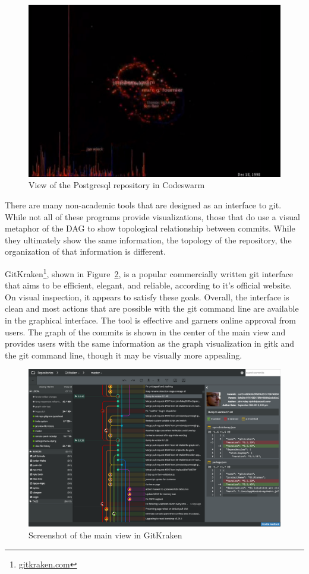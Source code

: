 \begin{figure}[htpb]
  \centering
  \includegraphics[width=0.8\linewidth]{Figures/introduction/codeswarm.png}
  \caption{View of the Postgresql repository in Codeswarm\cite{ogawa09}}
  \label{fig:codeswarm}
\end{figure}

There are many non-academic tools that are designed as an interface to
git.
While not all of these programs provide visualizations, those that
do use a visual metaphor of the DAG to show topological relationship
between commits.
While they ultimately show the same information, the topology of the
repository, the organization of that information is different.

GitKraken\footnote{\url{gitkraken.com}},
shown in Figure~\ref{fig:gitkraken_main}, is a popular
commercially written git interface that aims to be efficient, elegant,
and reliable, according to it's official website.
On visual inspection, it appears to satisfy these goals.
Overall, the interface is clean and most actions that are possible with
the git command line are available in the graphical interface.
The tool is effective and garners online approval from users.
The graph of the commits is shown in the center of the main view and
provides users with the same information as the graph visualization in
gitk and the git command line, though it may be visually more appealing.

\begin{figure}[htpb]
  \centering
  \includegraphics[width=0.8\linewidth]{Figures/introduction/gitkraken_main.png}
  \caption{Screenshot of the main view in GitKraken}
  \label{fig:gitkraken_main}
\end{figure}

